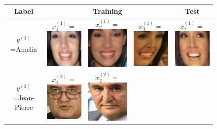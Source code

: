 \begin{figure}
\centering
\begin{tabular}{|c|ccc|c|}
\hline
Label & & Training & & Test\\ \hline
$y^{(1)}$=Amelia & 
  $x_1^{(1)} = $\includegraphics[scale = 0.2]{../../proposal/face_photos/Amelia_Vega_0001.png} &  
  $x_2^{(1)} = $\includegraphics[scale = 0.2]{../../proposal/face_photos/Amelia_Vega_0002.png} &  
  $x_3^{(1)} = $\includegraphics[scale = 0.2]{../../proposal/face_photos/Amelia_Vega_0003.png} &  
  $x_*^{(1)} = $\includegraphics[scale = 0.2]{../../proposal/face_photos/Amelia_Vega_0004.png} \\ \hline
$y^{(2)}$=Jean-Pierre & 
  $x_1^{(2)} = $\includegraphics[scale = 0.2]{../../proposal/face_photos/Jean-Pierre_Raffarin_0001.png} &  
  $x_2^{(2)} = $\includegraphics[scale = 0.2]{../../proposal/face_photos/Jean-Pierre_Raffarin_0002.png} &  

\end{tabular}
\end{figure}
